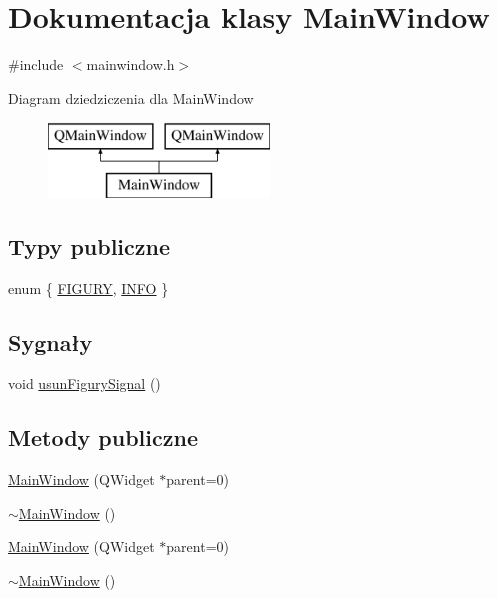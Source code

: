 \hypertarget{classMainWindow}{\section{Dokumentacja klasy Main\-Window}
\label{classMainWindow}
}


{\ttfamily \#include $<$mainwindow.\-h$>$}

Diagram dziedziczenia dla Main\-Window\begin{figure}[H]
\begin{center}
\leavevmode
\includegraphics[height=2.000000cm]{d6/d1a/classMainWindow}
\end{center}
\end{figure}
\subsection*{Typy publiczne}
\begin{DoxyCompactItemize}
\item 
enum \{ \hyperlink{classMainWindow_ac0baac8464ccf6e6ea7e8f21f18484ffa67c2ad1aed243f6be7a551108477d9e0}{F\-I\-G\-U\-R\-Y}, 
\hyperlink{classMainWindow_ac0baac8464ccf6e6ea7e8f21f18484ffa642a5a52542d22e67554f60eda6e541d}{I\-N\-F\-O}
 \}
\end{DoxyCompactItemize}
\subsection*{Sygnały}
\begin{DoxyCompactItemize}
\item 
void \hyperlink{classMainWindow_a5375b14904048c4f5c258183999afbf3}{usun\-Figury\-Signal} ()
\end{DoxyCompactItemize}
\subsection*{Metody publiczne}
\begin{DoxyCompactItemize}
\item 
\hyperlink{classMainWindow_a8b244be8b7b7db1b08de2a2acb9409db}{Main\-Window} (Q\-Widget $\ast$parent=0)
\item 
\hyperlink{classMainWindow_ae98d00a93bc118200eeef9f9bba1dba7}{$\sim$\-Main\-Window} ()
\item 
\hyperlink{classMainWindow_a8b244be8b7b7db1b08de2a2acb9409db}{Main\-Window} (Q\-Widget $\ast$parent=0)
\item 
\hyperlink{classMainWindow_ae98d00a93bc118200eeef9f9bba1dba7}{$\sim$\-Main\-Window} ()
\end{DoxyCompactItemize}
